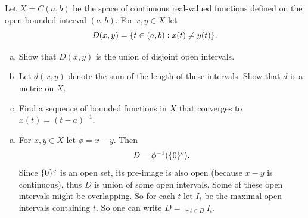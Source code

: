  
 \begin{problem}
 	Let $ X = C(a,b) $ be the space of continuous real-valued functions defined on the open bounded interval $ (a,b) $.  For $ x,y\in X $ let
 	\[ D(x,y) = \{t\in(a,b): x(t)\neq y(t)\}. \]
 	\begin{enumerate}[(a)]
 		\item Show that $ D(x,y) $ is the union of disjoint open intervals.
 		\item Let $ d(x,y) $ denote the sum of the length of these intervals. Show that $ d $ is a metric on $ X $.
 		\item Find a sequence of bounded functions in $ X $ that converges to $ x(t) = (t-a)^{-1} $.
 	\end{enumerate}
 \end{problem}
 
 \begin{solution}
 	\begin{enumerate}[(a)]
 		\item For $ x,y\in X $ let $ \phi = x-y $. Then 
 		\[ D = \phi^{-1}(\{0\}^c). \]
 		Since $ \{0\}^c $ is an open set, its pre-image is also open (because $ x-y $ is continuous), thus $ D $ is union of some open intervals. Some of these open intervals might be overlapping. So for each $ t $ let $ I_t $ be the maximal open intervals containing $ t $. So one can write $ D = \cup_{t\in D} I_t $.
  	\end{enumerate}
 \end{solution}
 
